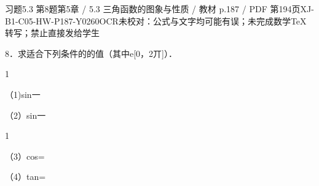 \begin{bankitem}{习题5.3 第8题}{第5章 / 5.3 三角函数的图象与性质 / 教材 p.187 / PDF 第194页}{XJ-B1-C05-HW-P187-Y0260}{OCR未校对：公式与文字均可能有误；未完成数学TeX转写；禁止直接发给学生}
\begin{ocrdraft}
\par
8．求适合下列条件的的值（其中e[0，2丌]）．
\par
1
\par
（1)sin一
\par
（2）sin一
\par
1
\par
（3）cos=
\par
（4）tan=
\end{ocrdraft}
\end{bankitem}
